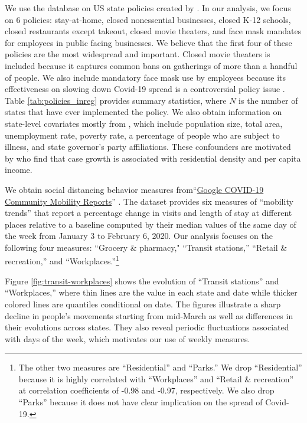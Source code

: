\documentclass[11pt,reqno,letter]{amsart}
\theoremstyle{definition}
\begin{document}
We use the database on US state policies created by
\cite{raifman2020}.
In our analysis, we focus on 6
policies:  stay-at-home, closed nonessential
businesses, closed K-12 schools, closed restaurants except takeout, closed movie theaters, and face mask mandates for employees in public facing businesses.
We believe that the first four of these
policies are the most widespread and important.
Closed movie theaters is included because it captures common bans on gatherings of more than
a handful of people. We also include mandatory face mask use by employees because its effectiveness on slowing down Covid-19 spread is a controversial policy issue \citep{howard2020,Greenhalghm2020,zhangr2020}.
Table \ref{tab:policies_inreg} provides summary statistics, where $N$ is the number of states that have ever implemented the policy. We also obtain information on state-level covariates mostly from \citet{raifman2020}, which include population size, total area, unemployment rate, poverty rate,  a percentage of people who are subject to illness, and state governor's party affiliations.  These confounders are motivated by \cite{wheaton2020} who find that case growth is associated  with residential density and per capita income.





We obtain social distancing behavior measures from``\href{https://www.google.com/covid19/mobility/}{Google COVID-19 Community Mobility Reports}''
\citep{google2020}.  The dataset provides six measures of ``mobility trends''  that report a percentage change in visits and length of stay at different places relative to a baseline computed by their median values of the same day of the week from January 3 to February 6, 2020.  Our analysis focuses on the following four measures: ``Grocery \& pharmacy," ``Transit stations,'' ``Retail \& recreation,'' and ``Workplaces.''\footnote{The other two measures are ``Residential'' and  ``Parks.''  We drop ``Residential'' because it is highly correlated with  ``Workplaces'' and  ``Retail \& recreation''  at correlation coefficients of -0.98 and -0.97, respectively. We also drop ``Parks'' because it does not have clear implication on the spread of Covid-19.}

Figure \ref{fig:transit-workplaces} shows the evolution of  ``Transit stations'' and ``Workplaces,'' where thin lines are the value in each state and date while thicker colored lines are quantiles  conditional on date. The figures illustrate a sharp decline in people's movements starting from mid-March as well as differences in their evolutions across states. They also reveal periodic fluctuations associated with days of the week, which motivates our use of weekly measures.
\end{document}
